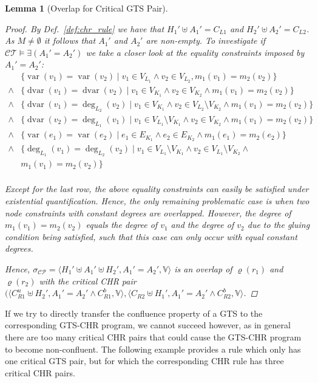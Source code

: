 \documentclass{tlp}
\newtheorem{lemma}[theorem]{Lemma}
\newcommand{\st}[3]{\ensuremath{\langle #1 , #2 , #3 \rangle}}
\newcommand{\CT}{\ensuremath{\mathcal{CT}}}
\newcommand{\mcCP}{\ensuremath{\mathcal{CP}}}
\newcommand{\bbV}{\ensuremath{\mathbb{V}}}
\DeclareMathOperator{\var}{var}
\DeclareMathOperator{\dvar}{dvar}
\newcommand{\chrrule}{\ensuremath{\varrho}}
\begin{document}
\begin{lemma}[Overlap for Critical GTS Pair]
\begin{proof}
By Def.~\ref{def:chr_rule} we have that $H_1' \uplus A_1' = C_{L1}$  and $H_2'
\uplus A_2' = C_{L2}$. As $M \ne \emptyset$ it follows that $A_1'$ and $A_2'$ are
non-empty. To investigate if $\CT \models \exists (A_1' = A_2')$ we take a closer
look at the equality constraints imposed by $A_1' = A_2'$: \[
\begin{array}{cl}
& \{\var(v_1) = \var(v_2) \mid v_1 \in V_{L_1} \land v_2 \in
V_{L_2}, m_1(v_1) = m_2(v_2) \} \\
\land & \{\dvar(v_1) = \dvar(v_2) \mid v_1 \in V_{K_1} \land v_2 \in V_{K_2}
\land m_1(v_1) = m_2(v_2) \}\\
\land & \{\dvar(v_1) = \deg_{L_2}(v_2) \mid v_1 \in V_{K_1} \land v_2 \in
V_{L_2} \setminus V_{K_2} \land m_1(v_1) = m_2(v_2) \} \\
\land & \{\dvar(v_2) = \deg_{L_1}(v_1) \mid v_1 \in V_{L_1} \setminus
V_{K_1} \land v_2 \in V_{K_2} \land m_1(v_1) = m_2(v_2) \} \\
\land & \{\var(e_1) = \var(e_2) \mid e_1 \in E_{K_1} \land e_2 \in E_{K_2}
\land m_1(e_1) = m_2(e_2) \}\\
\land & \{\deg_{L_1}(v_1) = \deg_{L_2}(v_2) \mid v_1 \in V_{L_1} \setminus
V_{K_1} \land v_2 \in V_{L_1} \setminus V_{K_2} \land\\& m_1(v_1) = m_2(v_2) \}
\\
\end{array}
\]

Except for the last row, the above equality constraints can easily be satisfied
under existential quantification. Hence, the only remaining problematic case is
when two node constraints with constant degrees are overlapped. However, the
degree of $m_1(v_1) = m_2(v_2)$ equals the degree of $v_1$ and the degree of
$v_2$ due to the gluing condition being satisfied, such that this case can only
occur with equal constant degrees.

Hence, $\sigma_{\mcCP} = \st{H_1' \uplus A_1' \uplus H_2'}{A_1' = A_2'}{\bbV}$ is
an overlap of $\chrrule(r_1)$ and $\chrrule(r_2)$ with the critical CHR
pair~$(\st{C_{R1}^u \uplus H_2'}{A_1' = A_2' \land C_{R1}^b}{\bbV},
\st{C_{R2} \uplus H_1'}{A_1' = A_2' \land C_{R2}^b}{\bbV}$.\end{proof}

\end{lemma}

If we try to directly transfer the confluence property of a GTS to the
corresponding GTS-CHR program, we cannot succeed however, as in general there are
too many critical CHR pairs that could cause the GTS-CHR program to become
non-confluent. The following example provides a rule which only has one critical
GTS pair, but for which the corresponding CHR rule has three critical CHR pairs.
\end{document}
